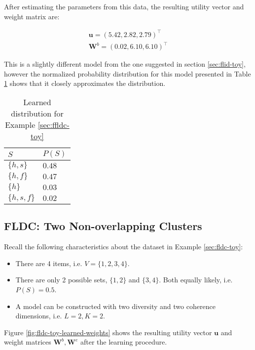 After estimating the parameters from this data, the resulting utility vector and weight matrix are:

\begin{align*}
  \mathbf{u} = \left(5.42,2.82,2.79\right)^{\intercal} \\
  \mathbf{W}^{b} = \left(0.02, 6.10, 6.10\right)^{\intercal}
\end{align*}

This is a slightly different model from the one suggested in section \ref{sec:flid-toy}, however the normalized probability distribution for this model presented in Table \ref{tab:flid-toy-learned-probs} shows that it closely approximates the distribution.

\begin{table}
  \centering
  \caption{Learned distribution for Example \ref{sec:ffldc-toy}}
  \begin{tabular}{@{}ll@{}}
    \toprule
    $S$ & $P(S)$\\
    \midrule
    $\{h,s\}$ & $0.48$ \\
    $\{h,f\}$ & $0.47$ \\
    $\{h\}$ & $0.03$ \\
    $\{h,s,f\}$ & $0.02$ \\
    \bottomrule
  \end{tabular}
  \label{tab:flid-toy-learned-probs}
\end{table}

\subsection{FLDC: Two Non-overlapping Clusters}

Recall the following characteristics about the dataset in Example \ref{sec:fldc-toy}:

\begin{itemize}
  \item There are 4 items, i.e. $V = \{1,2,3,4\}$.
  \item There are only 2 possible sets, $\{1,2\}$ and $\{3,4\}$. Both equally likely, i.e. $P(S) = 0.5$.
  \item A model can be constructed with two diversity and two coherence dimensions, i.e. $L=2,K=2$.
\end{itemize}

Figure \ref{fig:fldc-toy-learned-weights} shows the resulting utility vector $\mathbf{u}$ and weight matrices $\mathbf{W}^{b}, \mathbf{W}^{e}$ after the learning procedure.

